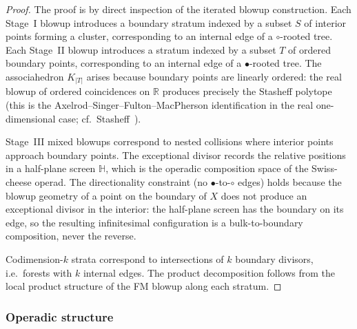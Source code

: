 \begin{proof}
The proof is by direct inspection of the iterated blowup
construction. Each Stage~I blowup introduces a boundary stratum
indexed by a subset $S$ of interior points forming a cluster,
corresponding to an internal edge of a $\circ$-rooted tree.
Each Stage~II blowup introduces a stratum indexed by a subset $T$
of ordered boundary points, corresponding to an internal edge of
a $\bullet$-rooted tree. The associahedron $K_{|T|}$ arises
because boundary points are linearly ordered: the real blowup
of ordered coincidences on $\mathbb R$ produces precisely the
Stasheff polytope (this is the Axelrod--Singer--Fulton--MacPherson
identification in the real one-dimensional case;
cf.~Stasheff~\cite{stasheff-associahedra}).

Stage~III mixed blowups correspond to nested collisions
where interior points approach boundary points. The exceptional
divisor records the relative positions in a half-plane screen
$\mathbb H$, which is the operadic composition space of the
Swiss-cheese operad. The directionality constraint (no
$\bullet$-to-$\circ$ edges) holds because the blowup geometry of
a point on the boundary of $X$ does not produce an exceptional
divisor in the interior: the half-plane screen has the boundary on
its edge, so the resulting infinitesimal configuration is
a bulk-to-boundary composition, never the reverse.

Codimension-$k$ strata correspond to intersections of $k$ boundary
divisors, i.e.\ forests with $k$ internal edges. The product
decomposition follows from the local product structure of the FM
blowup along each stratum.
\end{proof}

\subsubsection{Operadic structure}

